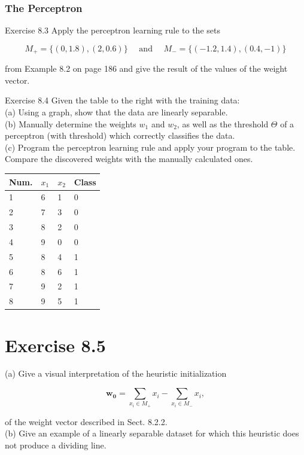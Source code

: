 \documentclass[10pt]{book}
\begin{document}
\subsubsection*{The Perceptron}
Exercise 8.3 Apply the perceptron learning rule to the sets


$$
M_{+}=\{(0,1.8),(2,0.6)\} \quad \text { and } \quad M_{-}=\{(-1.2,1.4),(0.4,-1)\}
$$

from Example 8.2 on page 186 and give the result of the values of the weight vector.

Exercise 8.4 Given the table to the right with the training data:\\
(a) Using a graph, show that the data are linearly separable.\\
(b) Manually determine the weights $w_{1}$ and $w_{2}$, as well as the threshold $\Theta$ of a perceptron (with threshold) which correctly classifies the data.\\
(c) Program the perceptron learning rule and apply your program to the table. Compare the discovered weights with the manually calculated ones.

\begin{center}
\begin{tabular}{llll}
\hline
Num. & $x_{1}$ & $x_{2}$ & Class \\
\hline
1 & 6 & 1 & 0 \\
\hline
2 & 7 & 3 & 0 \\
\hline
3 & 8 & 2 & 0 \\
\hline
4 & 9 & 0 & 0 \\
\hline
5 & 8 & 4 & 1 \\
\hline
6 & 8 & 6 & 1 \\
\hline
7 & 9 & 2 & 1 \\
\hline
8 & 9 & 5 & 1 \\
\hline
\end{tabular}
\end{center}

\section*{Exercise 8.5}
(a) Give a visual interpretation of the heuristic initialization

$$
\boldsymbol{w}_{\mathbf{0}}=\sum_{x_{i} \in M_{+}} x_{i}-\sum_{x_{i} \in M_{-}} x_{i},
$$

of the weight vector described in Sect. 8.2.2.\\
(b) Give an example of a linearly separable dataset for which this heuristic does not produce a dividing line.
\end{document}
